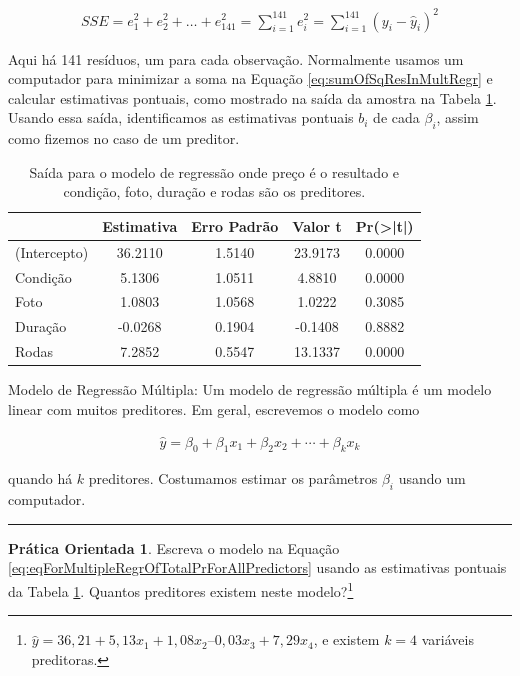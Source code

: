 \documentclass[
]{book}
\theoremstyle{definition}
\theoremstyle{definition}
\theoremstyle{definition}
\newtheorem{exercise}{Prática Orientada}[chapter]
\theoremstyle{definition}
\theoremstyle{remark}
\begin{document}
\begin{align}
SSE = e_1^2 + e_2^2 + \dots + e_{141}^2
      = \sum_{i=1}^{141} e_i^2
      = \sum_{i=1}^{141} \left(y_i - \hat{y}_i\right)^2
\label{eq:sumOfSqResInMultRegr}
\end{align}

Aqui há 141 resíduos, um para cada observação. Normalmente usamos um computador para minimizar a soma na Equação \eqref{eq:sumOfSqResInMultRegr} e calcular estimativas pontuais, como mostrado na saída da amostra na Tabela \ref{tab:outputForMultipleRegrOutputForAllPredictors}. Usando essa saída, identificamos as estimativas pontuais \(b_i\) de cada \(\beta_i\), assim como fizemos no caso de um preditor.

\begin{table}

\caption{\label{tab:outputForMultipleRegrOutputForAllPredictors}Saída para o modelo de regressão onde preço é o resultado e condição, foto, duração e rodas são os preditores.}
\centering
\begin{tabular}[t]{l|c|c|c|c}
\hline
  & Estimativa & Erro Padrão & Valor t & Pr(>|t|)\\
\hline
(Intercepto) & 36.2110 & 1.5140 & 23.9173 & 0.0000\\
\hline
Condição & 5.1306 & 1.0511 & 4.8810 & 0.0000\\
\hline
Foto & 1.0803 & 1.0568 & 1.0222 & 0.3085\\
\hline
Duração & -0.0268 & 0.1904 & -0.1408 & 0.8882\\
\hline
Rodas & 7.2852 & 0.5547 & 13.1337 & 0.0000\\
\hline
\end{tabular}
\end{table}

Modelo de Regressão Múltipla: Um modelo de regressão múltipla é um modelo linear com muitos preditores. Em geral, escrevemos o modelo como

\begin{align*}
\hat{y} = \beta_0 + \beta_1 x_1 + \beta_2 x_2 + \cdots + \beta_k x_k %
\end{align*}

quando há \(k\) preditores. Costumamos estimar os parâmetros \(\beta_i\) usando um computador.

\begin{center}\rule{0.5\linewidth}{0.5pt}\end{center}

\begin{exercise}
\protect\hypertarget{exr:eqForMultipleRegrOfTotalPrForAllPredictorsWithCoefficients}{}{\label{exr:eqForMultipleRegrOfTotalPrForAllPredictorsWithCoefficients} }Escreva o modelo na Equação \eqref{eq:eqForMultipleRegrOfTotalPrForAllPredictors} usando as estimativas pontuais da Tabela \ref{tab:outputForMultipleRegrOutputForAllPredictors}. Quantos preditores existem neste modelo?\footnote{\(\hat{y} = 36,21 + 5,13x_1 + 1,08x_2 – 0,03x_3 + 7,29x_4\), e existem \(k=4\) variáveis preditoras.}
\end{exercise}
\end{document}
